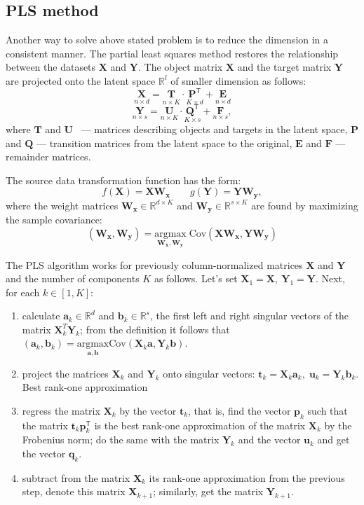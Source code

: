 \documentclass[bst/sn-mathphys]{sn-jnl}%
\newcommand{\bx}{\ensuremath{\mathbf{x}}}
\newcommand{\by}{\mathbf{y}}
\newcommand{\ba}{\mathbf{a}}
\newcommand{\bb}{\mathbf{b}}
\newcommand{\bp}{\mathbf{p}}
\newcommand{\bq}{\mathbf{q}}
\newcommand{\bt}{\mathbf{t}}
\newcommand{\bu}{\mathbf{u}}
\newcommand{\bT}{\mathbf{T}}
\newcommand{\bX}{\mathbf{X}}
\newcommand{\bW}{\mathbf{W}}
\newcommand{\bY}{\mathbf{Y}}
\newcommand{\bU}{\mathbf{U}}
\newcommand{\bQ}{\mathbf{Q}}
\newcommand{\bP}{\mathbf{P}}
\newcommand{\bE}{\mathbf{E}}
\newcommand{\bF}{\mathbf{F}}
\newcommand{\dR}{\mathbb{R}}
\renewcommand{\T}{^{\mathsf{T}}}
\theoremstyle{thmstyleone}%
\theoremstyle{thmstyletwo}%
\theoremstyle{thmstylethree}%
\begin{document}
\subsection{PLS method}
Another way to solve above stated problem is to reduce the dimension in a consistent manner.
The partial least squares method restores the relationship between the datasets $\bX$ and $\bY$.
The object matrix $\bX$ and the target matrix $\bY$ are projected onto the latent space $\dR^l$ of smaller dimension as follows:
$$ \underset{n \times d}{\bX} = \underset{n \times K}{\bT} \cdot \underset{K \times d}{\bP\T} + \underset{n \times d}{\bE} $$
$$ \underset{n \times s}{\bY} = \underset{n \times K}{\bU} \cdot \underset{K \times s}{\bQ\T} + \underset{n \times s}{\bF}, $$
where $\bT$ and $\bU$ ~--- matrices describing objects and targets in the latent space, $\bP$ and $\bQ$ --- transition matrices from the latent space to the original, $\bE$ and $\bF$ --- remainder matrices.

The source data transformation function has the form:
$$f(\bX) = \bX\bW_{\bx}\qquad g(\bY) = \bY\bW_{\by}, $$
where the weight matrices $\bW_{\bx} \in \dR^{d \times K}$ and $\bW_{\by}\in \dR^{s \times K}$ are found by maximizing the sample covariance:
$$ (\bW_{\bx}, \bW_{\by}) = \underset{\bW_{\bx}, \bW_{\by}}{\text{argmax}}\; \text{Cov}(\bX\bW_{\bx}, \bY\bW_{\by})$$

The PLS algorithm works for previously column-normalized matrices $\bX$ and $\bY$ and the number of components $K$ as follows.
Let's set $\bX_1 = \bX, \: \bY_1 = \bY$.
Next, for each $k \in [1, K]$:
\begin{enumerate}
	\item calculate $\ba_k\in \dR^d$ and $\bb_k\in \dR^s$, the first left and right singular vectors of the matrix $\bX_k^T\bY_k$; from the definition it follows that $(\ba_k, \bb_k) = \underset{\ba, \bb}{\text{argmax}} \text{Cov} (\bX_k \ba, \bY_k \bb)$.
	\item project the matrices $\bX_k$ and $\bY_k$ onto singular vectors: $\bt_k = \bX_k \ba_k, \; \bu_k = \bY_k\bb_k$.
	Best rank-one approximation
	\item regress the matrix $\bX_k$ by the vector $\bt_k$, that is, find the vector $\bp_k$ such that the matrix $\bt_k\bp_k\T$ is the best rank-one approximation of the matrix $\bX_k$ by the Frobenius norm; do the same with the matrix $\bY_k$ and the vector $\bu_k$ and get the vector $\bq_k$.
	\item subtract from the matrix $\bX_k$ its rank-one approximation from the previous step, denote this matrix $\bX_{k+1}$; similarly, get the matrix $\bY_{k+1}$.
\end{enumerate}
\end{document}
